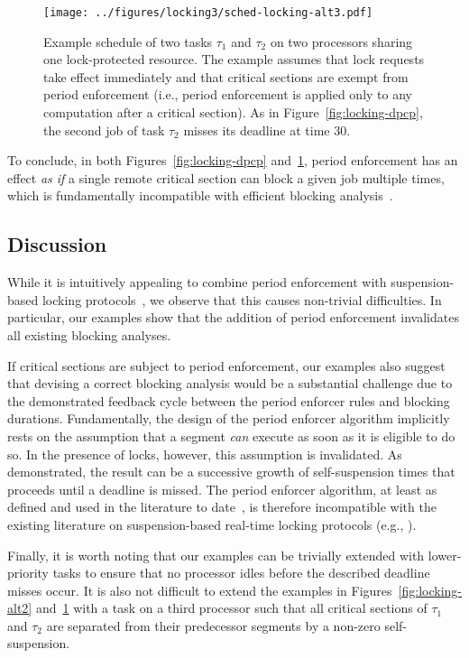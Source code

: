 \begin{figure}[t]
  \centering
  \texttt{[image: ../figures/locking3/sched-locking-alt3.pdf]}
  \caption{Example schedule of two tasks $\tau_1$ and $\tau_2$ on two processors sharing one lock-protected resource. The example assumes that lock requests take effect immediately and that critical sections are exempt from period enforcement (i.e., period enforcement is applied only to any computation after a critical section). As in Figure~\ref{fig:locking-dpcp}, the second job of task $\tau_2$ misses its deadline at time $30$.
  }
  \label{fig:locking-alt3}
\end{figure}

To conclude, in both Figures~\ref{fig:locking-dpcp} and~\ref{fig:locking-alt3}, period enforcement has an effect  \emph{as if} a single remote critical section can block a given job multiple times, which is fundamentally incompatible with efficient blocking analysis~\cite{Br:13}.

\subsection{Discussion}

While it is intuitively appealing to combine period enforcement with suspension-based locking protocols~\cite{Raj:91,Lak:11,LNR:09}, we observe that this causes non-trivial difficulties. In particular, our examples show that the addition of period enforcement invalidates all existing blocking analyses. 


If critical sections are subject to period enforcement, our examples also suggest that devising a correct blocking analysis would be a substantial challenge due to the demonstrated feedback cycle between the period enforcer rules and blocking durations. Fundamentally, the design of the period enforcer algorithm implicitly rests on the assumption that a segment \emph{can} execute as soon as it is eligible to do so. In the presence of locks, however, this assumption is invalidated. As demonstrated, the result can be a successive growth of self-suspension times that proceeds until a deadline is missed.  The period enforcer algorithm, at least as defined and used in the literature to date~\cite{Raj:suspension1991,Raj:91}, is therefore incompatible with the existing literature on suspension-based real-time locking protocols (e.g., \cite{Raj:91,Lak:11,LNR:09,BLBA:07,Br:13}). 

Finally, it is worth noting that our examples can be trivially extended with lower-priority tasks to ensure that no processor idles before the described deadline misses occur. It is also not difficult to extend the examples in Figures~\ref{fig:locking-alt2} and~\ref{fig:locking-alt3} with a task on a third processor such that all critical sections of $\tau_1$ and $\tau_2$ are separated from their predecessor segments by a non-zero self-suspension.
